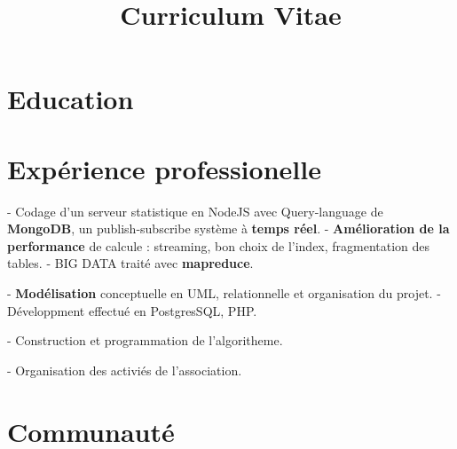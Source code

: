 \documentclass[11pt,a4paper]{moderncv}
\title{Curriculum Vitae}
\begin{document}
\maketitle

\section{Education}


\section{Expérience professionelle}

{
- Codage d'un serveur statistique en NodeJS avec Query-language de \textbf{MongoDB}, un publish-subscribe système à \textbf{temps réel}.\newline
- \textbf{Amélioration de la performance} de calcule : streaming, bon choix de l'index, fragmentation des tables.\newline
- BIG DATA traité avec \textbf{mapreduce}.
}

{
- \textbf{Modélisation} conceptuelle en UML, relationnelle et organisation du projet.\newline
- Développment effectué en PostgresSQL, PHP.
}

{
- Construction et programmation de l'algoritheme.
}

{
- Organisation des activiés de l'association.
}

\section{Communauté}
\end{document}

